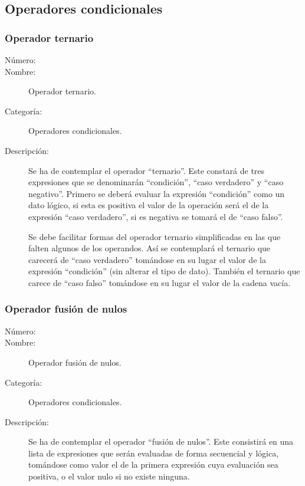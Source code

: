 \subsection{Operadores condicionales}
\subsubsection{Operador ternario}
	\begin{description}
		\item [Número:] \cn
		\item [Nombre:] Operador ternario.
		\item [Categoría:] Operadores condicionales.
		\item [Descripción:] Se ha de contemplar el operador ``ternario''. Este constará de tres expresiones que se denominarán
		``condición'', ``caso verdadero'' y ``caso negativo''. Primero se deberá evaluar la expresión ``condición'' como un
		dato lógico, si esta es positiva el valor de la operación será el de la expresión ``caso verdadero'', si es negativa
		se tomará el de ``caso falso''.
		
		Se debe facilitar formas del operador ternario simplificadas en las que falten algunos
		de los operandos. Así se contemplará el ternario que carecerá de ``caso verdadero'' tomándose en su lugar
		el valor de la expresión ``condición'' (sin alterar el tipo de dato). También el ternario que carece de ``caso falso''
		tomándose en su lugar el valor de la cadena vacía.
	\end {description}

\subsubsection{Operador fusión de nulos}
	\begin{description}
		\item [Número:] \cn
		\item [Nombre:] Operador fusión de nulos.
		\item [Categoría:] Operadores condicionales.
		\item [Descripción:] Se ha de contemplar el operador ``fusión de nulos''. Este consistirá en una lista de expresiones que serán
		evaluadas de forma secuencial y lógica, tomándose como valor el de la primera expresión
		cuya evaluación sea positiva, o el valor nulo si no existe ninguna.
	\end {description}
